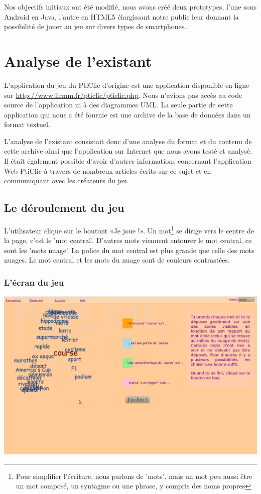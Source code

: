 \documentclass[a4paper,11pt,french]{article}
\begin{document}
Nos objectifs initiaux ont été modifié, nous avons créé deux prototypes, l'une sous Android en Java, l'autre en HTML5 élargissant notre public leur donnant la possibilité de jouer au jeu sur divers types de smartphones.  


\pagebreak

 
\section{Analyse de l'existant}

L'application du jeu du PtiClic d'origine est une application disponible en ligne sur \url{http://www.lirmm.fr/pticlic/pticlic.php}. Nous
n'avions pas accès au code source de l'application ni à des diagrammes UML. La seule partie de cette application qui nous a été fournie est
une archive de la base de données dans un format textuel.

L'analyse de l'existant consistait donc d'une analyse du format et du contenu de cette archive ainsi que l'application sur Internet que nous avons testé et analysé. Il était également possible d'avoir d'autres informations concernant l'application Web PtiClic à travers de nombreux articles écrits sur ce sujet et en communiquant avec les créateurs du jeu.

\subsection{Le déroulement du jeu}
L'utilisateur clique sur le boutont «Je joue !». Un mot\footnote{Pour simplifier l'écriture, nous parlons de 'mots', mais un mot peu aussi être un mot composé, un syntagme ou une phrase, y compris des noms propres} se dirige vers le centre de la page, c'est le 'mot central'. D'autres mots viennent entourer le mot central, ce sont les 'mots nuage'. La police du mot central est plus grande que celle des mots nuages. Le mot central et les mots du nuage sont de couleurs contrastées.

\subsubsection{L'écran du jeu}
\begin{center}
\includegraphics[width=14cm]{img/PtiClicJeu.png}
\end{center}
\end{document}

